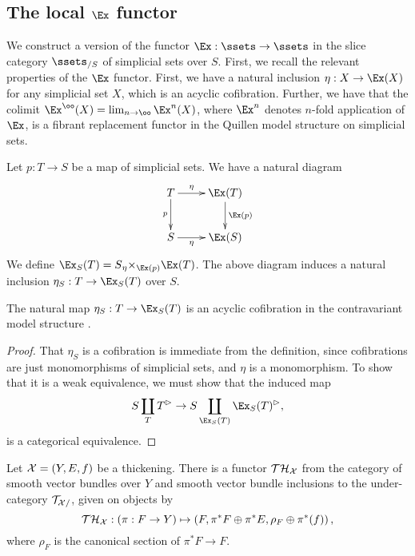 \subsection{The local $\Ex$ functor}


We construct a version of the functor $\Ex: \ssets \to \ssets$ in the slice category $\ssets_{/S}$ of simplicial sets over $S$. First, we recall the relevant properties of the $\Ex$ functor. First, we have a natural inclusion $\eta: X \to \Ex(X)$ for any simplicial set $X$, which is an acyclic cofibration. Further, we have that the colimit $\Ex^\oo(X) = \lim_{n \to \oo} \Ex^n(X)$, where $\Ex^n$ denotes $n$-fold application of $\Ex$, is a fibrant replacement functor in the Quillen model structure on simplicial sets.

\begin{definition}\label{local-Ex}
Let $p: T \to S$ be a map of simplicial sets. We have a natural diagram
\[\xymatrix{
T \ar[r]^-{\eta} \ar[d]_-{p} & \Ex(T) \ar[d]^-{\Ex(p)} \\
S \ar[r]_-{\eta} & \Ex(S)
}\]
We define $\Ex_S(T) = S {}_{\eta}{\times}_{\Ex(p)} \Ex(T)$. The above diagram induces a natural inclusion $\eta_S:T \to \Ex_S(T)$ over $S$.
\end{definition}


\begin{prop}\label{local-Ex-weak-equivalence}
The natural map $\eta_S: T \to \Ex_S(T)$ is an acyclic cofibration in the contravariant model structure .
\end{prop}

\begin{proof}
That $\eta_S$ is a cofibration is immediate from the definition, since cofibrations are just monomorphisms of simplicial sets, and $\eta$ is a monomorphism. To show that it is a weak equivalence, we must show that the induced map
\[ S \coprod_T T^\rhd \to S \coprod_{\Ex_S(T)} \Ex_S(T)^\rhd, \]
is a categorical equivalence. 
\end{proof}

\begin{remark}
Let $\mathcal X = (Y, E, f)$ be a thickening. There is a functor ${\mathcal T \mathcal H}_\mathcal X$ from the category of smooth vector bundles over $Y$ and smooth vector bundle inclusions to the under-category $\mathcal T_{\mathcal X/}$, given on objects by
\[ {\mathcal T \mathcal H}_\mathcal X: \left(\pi: F \to Y\right) \mapsto \left(F, \pi^* F \oplus \pi^* E, \rho_F \oplus \pi^*(f) \right),\]
where $\rho_F$ is the canonical section of $\pi^* F \to F$.
\end{remark}


